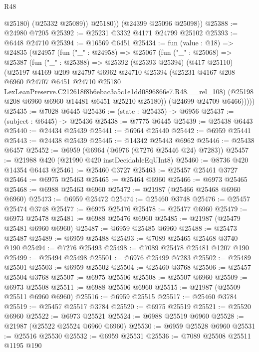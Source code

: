 \begin{lexlean}{R48}
\begin{coremodule}
              @25180)
            (@25332 @25089))
          @25180))
      (@24399 @25096 @25098))
@25388 := @24980 @7205
@25392 := @25231 @3332 @4171 @24799 @25102
@25393 := @6448 @24710
@25394 := @16569 @6451
@25434 := fun (value : @18) =>
  @24835
    (@24957
      (fun ("_" : @24958) =>
      @25067
        (fun ("_" : @25068) =>
        @25387
          (fun ("_" : @25388) =>
          @25392
            (@25393 @25394)
            (@417 @25110)
            (@25197
              @4169
              @209
              @24797
              @6962
              @24710
              @25394
              (@25231
                @4167
                @208
                @6960
                @24707
                @6451
                @24710
                @25180
                LexLeanPreserve.C212618f8b6ebac3a5c1e1dd0896866e7.R48.__rel_108)
              (@25198 @208 @6960 @6960 @14481 @6451 @25210 @25180))
            (@24699 @24709 @6466)))))
@25435 := @7028 @6445
@25436 := (state : @25435) -> @6956
@25437 := (subject : @6445) -> @25436
@25438 := @7775 @6445
@25439 := @25438 @6443
@25440 := @24434 @25439
@25441 := @6964 @25440
@25442 := @6959 @25441
@25443 := @24438 @25439
@25445 := @14342 @25443 @6962
@25446 := @25438 @6457
@25452 := @6959 (@6964 (@6976 (@7276 @25446 @24) @7283))
@25457 := @21988 @420 (@21990 @420 instDecidableEqUInt8)
@25460 := @8736 @420 @14354 @6443
@25461 := @25460 @3727
@25463 := @25457 @25461 @3727
@25464 := @6975 @25463
@25465 := @25464 @6960
@25466 := @6973 @25465
@25468 := @6988 @25463 @6960
@25472 := @21987 (@25466 @25468 @6960 @6960)
@25473 := @6959 @25472
@25474 := @25460 @3748
@25476 := @25457 @25474 @3748
@25477 := @6975 @25476
@25478 := @25477 @6960
@25479 := @6973 @25478
@25481 := @6988 @25476 @6960
@25485 := @21987 (@25479 @25481 @6960 @6960)
@25487 := @6959 @25485 @6960
@25488 := @25473 @25487
@25489 := @6959 @25488
@25493 := @7089 @25465 @25468 @3740 @190
@25494 := @7276 @25493
@25498 := @7089 @25478 @25481 @1207 @190
@25499 := @25494 @25498
@25501 := @6976 @25499 @7283
@25502 := @25489 @25501
@25503 := @6959 @25502
@25504 := @25460 @3768
@25506 := @25457 @25504 @3768
@25507 := @6975 @25506
@25508 := @25507 @6960
@25509 := @6973 @25508
@25511 := @6988 @25506 @6960
@25515 := @21987 (@25509 @25511 @6960 @6960)
@25516 := @6959 @25515
@25517 := @25460 @3784
@25519 := @25457 @25517 @3784
@25520 := @6975 @25519
@25521 := @25520 @6960
@25522 := @6973 @25521
@25524 := @6988 @25519 @6960
@25528 := @21987 (@25522 @25524 @6960 @6960)
@25530 := @6959 @25528 @6960
@25531 := @25516 @25530
@25532 := @6959 @25531
@25536 := @7089 @25508 @25511 @1195 @190

\end{coremodule}
\end{lexlean}
